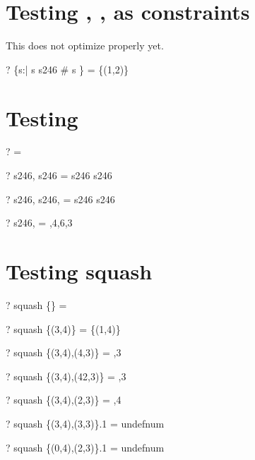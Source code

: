 \documentclass{article}
\begin{document}
\section{Testing \prefix, \suffix, \infix as constraints}
 This does not optimize properly yet.  
 \begin{zed} \vdash? \{s:\seq \nat | s \prefix s246 \land \# s \} = \power \{(1,2)\} \end{zed}

\section{Testing \dcat}
\begin{zed} \vdash? \dcat \langle \rangle = \langle \rangle \end{zed}
\begin{zed} \vdash? \dcat \langle s246, s246 \rangle = s246 \cat s246 \end{zed}
\begin{zed} \vdash? \dcat \langle s246, s246, \emptyset \rangle = s246 \cat s246 \end{zed}
\begin{zed} \vdash? \dcat \langle s246,  \rangle \rangle = ,4,6,3 \rangle \end{zed}

\section{Testing squash}
\begin{zed} \vdash? squash \{\} = \langle \rangle \end{zed}
\begin{zed} \vdash? squash \{(3,4)\} = \{(1,4)\} \end{zed}
\begin{zed} \vdash? squash \{(3,4),(4,3)\} = ,3 \rangle \end{zed}
\begin{zed} \vdash? squash \{(3,4),(42,3)\} = ,3 \rangle \end{zed}
\begin{zed} \vdash? squash \{(3,4),(2,3)\} = ,4 \rangle \end{zed}
\begin{zed} \vdash? squash \{(3,4),(3,3)\}.1 = \langle undefnum \rangle \end{zed}
\begin{zed} \vdash? squash \{(0,4),(2,3)\}.1 = \langle undefnum \rangle \end{zed}
\end{document}
